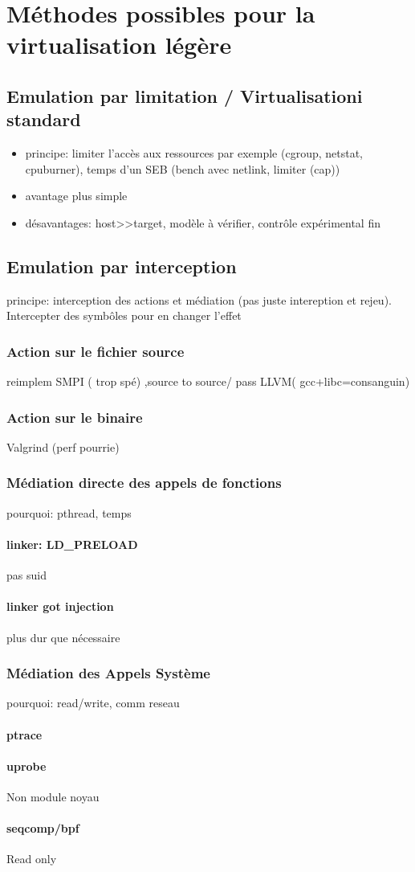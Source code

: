 \section{Méthodes possibles pour la virtualisation légère}
\subsection{Emulation par limitation / Virtualisationi standard}
\begin{itemize}
\item principe: limiter l'accès aux ressources par exemple (cgroup, netstat, cpuburner), temps d'un SEB (bench avec netlink, limiter (cap))
\item avantage plus simple
\item désavantages: host>>target, modèle à vérifier, contrôle expérimental fin
\end{itemize}

\subsection{Emulation par interception}
 principe: interception des actions et médiation (pas juste intereption et rejeu). Intercepter des symbôles pour en changer l'effet

\subsubsection{Action sur le fichier source}
reimplem SMPI ( trop spé) ,source to source/ pass LLVM( gcc+libc=consanguin) 

\subsubsection{Action sur le binaire}
Valgrind (perf pourrie)

\subsubsection{Médiation directe des appels de fonctions}
pourquoi: pthread, temps

\paragraph{linker: LD\_PRELOAD}
pas suid
\paragraph{linker got injection}
plus dur que nécessaire

\subsubsection{Médiation des Appels Système}
pourquoi: read/write, comm reseau

\paragraph{ptrace}

\paragraph{uprobe}
Non module noyau

\paragraph{seqcomp/bpf}
Read only

